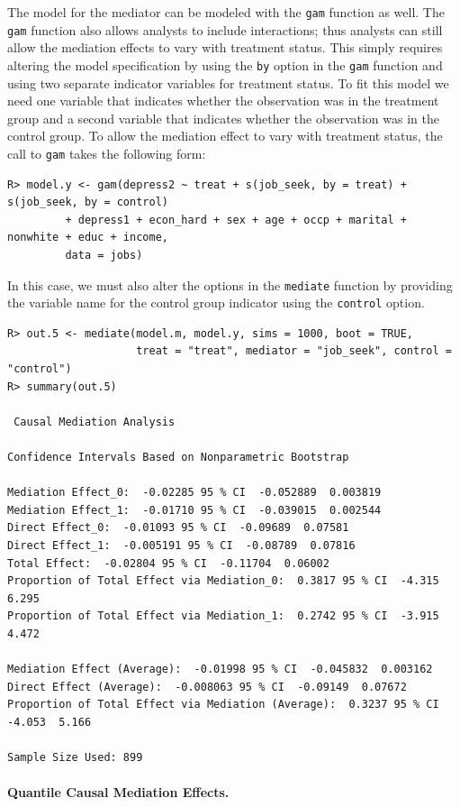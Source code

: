 \documentclass[11pt,letterpaper]{article}
\theoremstyle{plain}
\begin{document}
The model for the mediator can be modeled with the \texttt{gam}
function as well.  The \texttt{gam} function also allows analysts to
include interactions; thus analysts can still allow the mediation
effects to vary with treatment status.  This simply requires altering
the model specification by using the \texttt{by} option in the
\texttt{gam} function and using two separate indicator variables for
treatment status.  To fit this model we need one variable that
indicates whether the observation was in the treatment group and a
second variable that indicates whether the observation was in the
control group.  To allow the mediation effect to vary with treatment
status, the call to \texttt{gam} takes the following form:
\begin{verbatim}
R> model.y <- gam(depress2 ~ treat + s(job_seek, by = treat) + s(job_seek, by = control)
         + depress1 + econ_hard + sex + age + occp + marital + nonwhite + educ + income,
         data = jobs)
\end{verbatim}
In this case, we must also alter the options in the \texttt{mediate}
function by providing the variable
name for the control group indicator using the \texttt{control} option.
\begin{verbatim}
R> out.5 <- mediate(model.m, model.y, sims = 1000, boot = TRUE,
                    treat = "treat", mediator = "job_seek", control = "control")
R> summary(out.5)

 Causal Mediation Analysis 

Confidence Intervals Based on Nonparametric Bootstrap

Mediation Effect_0:  -0.02285 95 % CI  -0.052889  0.003819 
Mediation Effect_1:  -0.01710 95 % CI  -0.039015  0.002544 
Direct Effect_0:  -0.01093 95 % CI  -0.09689  0.07581 
Direct Effect_1:  -0.005191 95 % CI  -0.08789  0.07816 
Total Effect:  -0.02804 95 % CI  -0.11704  0.06002 
Proportion of Total Effect via Mediation_0:  0.3817 95 % CI  -4.315  6.295 
Proportion of Total Effect via Mediation_1:  0.2742 95 % CI  -3.915  4.472 

Mediation Effect (Average):  -0.01998 95 % CI  -0.045832  0.003162 
Direct Effect (Average):  -0.008063 95 % CI  -0.09149  0.07672 
Proportion of Total Effect via Mediation (Average):  0.3237 95 % CI  -4.053  5.166 

Sample Size Used: 899 
\end{verbatim}

\paragraph{Quantile Causal Mediation Effects.}
\end{document}
